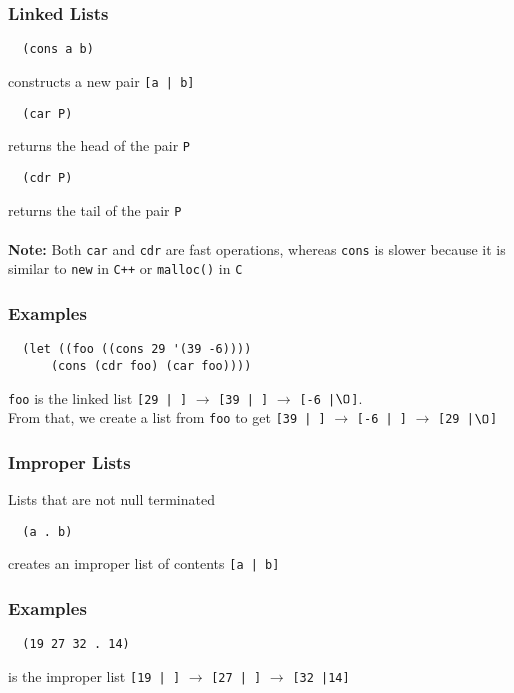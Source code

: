 \documentclass[13pt]{article}
\begin{document}
\subsubsection{Linked Lists}
\begin{verbatim}
  (cons a b) \end{verbatim}
constructs a new pair \texttt{[a | b]}
\begin{verbatim}
  (car P) \end{verbatim}
returns the head of the pair \texttt{P}
\begin{verbatim}
  (cdr P) \end{verbatim}
returns the tail of the pair \texttt{P} \\ \\
\textbf{Note:} Both \texttt{car} and \texttt{cdr} are fast operations, whereas \texttt{cons} is slower because it is similar to \texttt{new} in \texttt{C++} or \texttt{malloc()} in \texttt{C}

\subsubsection*{Examples}
\begin{verbatim}
  (let ((foo ((cons 29 '(39 -6))))
      (cons (cdr foo) (car foo)))) \end{verbatim}
    \texttt{foo} is the linked list \texttt{[29 | ]} $\rightarrow$ \texttt{[39 | ]} $\rightarrow$ \texttt{[-6 |$\O$]}. \\
    From that, we create a list from \texttt{foo} to get \texttt{[39 | ]} $\rightarrow$ \texttt{[-6 | ]} $\rightarrow$ \texttt{[29 |$\O$]}

    \subsubsection{Improper Lists}
    Lists that are not null terminated
\begin{verbatim}
  (a . b) \end{verbatim}
creates an improper list of contents \texttt{[a | b]}

\subsubsection*{Examples}
\begin{verbatim}
  (19 27 32 . 14) \end{verbatim}
is the improper list \texttt{[19 | ]} $\rightarrow$ \texttt{[27 | ]} $\rightarrow$ \texttt{[32 |14]}
\end{document}
